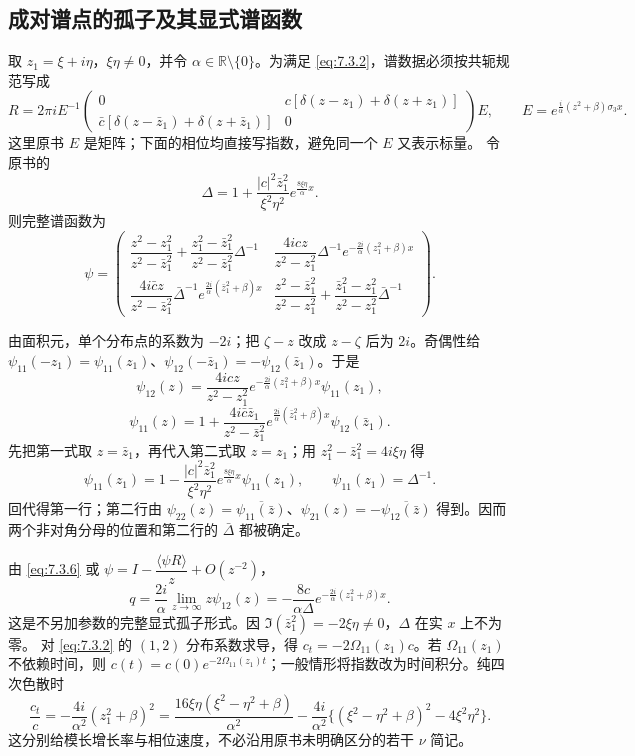\documentclass[lang=cn,scheme=chinese,mode=simple,device=normal,color=blue,math=cm,thmcnt=section,12pt]{elegantbook}
\newcommand{\eqq}[2]{\tag{#1}\label{eq:#1}#2}
\begin{document}
\subsection{成对谱点的孤子及其显式谱函数}
取 $z_1=\xi+i\eta$，$\xi\eta\ne0$，并令 $\alpha\in\mathbb R\setminus\{0\}$。为满足 \eqref{eq:7.3.2}，谱数据必须按共轭规范写成
\begin{equation}
\eqq{7.3.17}{R=2\pi i E^{-1}\begin{pmatrix}0&c[\delta(z-z_1)+\delta(z+z_1)]\\
\bar c[\delta(z-\bar z_1)+\delta(z+\bar z_1)]&0\end{pmatrix}E,
\qquad E=e^{\frac{i}{\alpha}(z^2+\beta)\sigma_3x}.}
\end{equation}
这里原书 $E$ 是矩阵；下面的相位均直接写指数，避免同一个 $E$ 又表示标量。
令原书的
\[
\Delta=1+\dfrac{|c|^2\bar z_1^2}{\xi^2\eta^2}e^{\frac{8\xi\eta}{\alpha}x}.
\]
则完整谱函数为
\begin{equation}
\eqq{7.3.18}{\psi=\begin{pmatrix}
\dfrac{z^2-z_1^2}{z^2-\bar z_1^2}+\dfrac{z_1^2-\bar z_1^2}{z^2-\bar z_1^2}\Delta^{-1}
&\dfrac{4icz}{z^2-z_1^2}\Delta^{-1}e^{-\frac{2i}{\alpha}(z_1^2+\beta)x}\\[5pt]
\dfrac{4i\bar cz}{z^2-\bar z_1^2}\bar\Delta^{-1}e^{\frac{2i}{\alpha}(\bar z_1^2+\beta)x}
&\dfrac{z^2-\bar z_1^2}{z^2-z_1^2}+\dfrac{\bar z_1^2-z_1^2}{z^2-z_1^2}\bar\Delta^{-1}
\end{pmatrix}.}
\end{equation}
\begin{callout}
由面积元，单个分布点的系数为 $-2i$；把 $\zeta-z$ 改成 $z-\zeta$ 后为 $2i$。奇偶性给 $\psi_{11}(-z_1)=\psi_{11}(z_1)$、$\psi_{12}(-\bar z_1)=-\psi_{12}(\bar z_1)$。于是
\[
\psi_{12}(z)=\dfrac{4icz}{z^2-z_1^2}e^{-\frac{2i}{\alpha}(z_1^2+\beta)x}\psi_{11}(z_1),
\]
\[
\psi_{11}(z)=1+\dfrac{4i\bar c\bar z_1}{z^2-\bar z_1^2}
e^{\frac{2i}{\alpha}(\bar z_1^2+\beta)x}\psi_{12}(\bar z_1).
\]
先把第一式取 $z=\bar z_1$，再代入第二式取 $z=z_1$；用 $z_1^2-\bar z_1^2=4i\xi\eta$ 得
\[
\psi_{11}(z_1)=1-\dfrac{|c|^2\bar z_1^2}{\xi^2\eta^2}e^{\frac{8\xi\eta}{\alpha}x}\psi_{11}(z_1),
\qquad \psi_{11}(z_1)=\Delta^{-1}.
\]
回代得第一行；第二行由 $\psi_{22}(z)=\overline{\psi_{11}(\bar z)}$、$\psi_{21}(z)=-\overline{\psi_{12}(\bar z)}$ 得到。因而两个非对角分母的位置和第二行的 $\bar\Delta$ 都被确定。
\end{callout}
由 \eqref{eq:7.3.6} 或 $\psi=I-\dfrac{\langle\psi R\rangle}{z}+O(z^{-2})$，
\[
q=\dfrac{2i}{\alpha}\lim\limits_{z\to\infty}z\psi_{12}(z)
=-\dfrac{8c}{\alpha\Delta}e^{-\frac{2i}{\alpha}(z_1^2+\beta)x}.
\]
这是不另加参数的完整显式孤子形式。因 $\Im(\bar z_1^2)=-2\xi\eta\ne0$，$\Delta$ 在实 $x$ 上不为零。
对 \eqref{eq:7.3.2} 的 $(1,2)$ 分布系数求导，得 $c_t=-2\Omega_{11}(z_1)c$。若 $\Omega_{11}(z_1)$ 不依赖时间，则
$c(t)=c(0)e^{-2\Omega_{11}(z_1)t}$；一般情形将指数改为时间积分。纯四次色散时
\[
\dfrac{c_t}{c}=-\dfrac{4i}{\alpha^2}(z_1^2+\beta)^2
=\dfrac{16\xi\eta(\xi^2-\eta^2+\beta)}{\alpha^2}
-\dfrac{4i}{\alpha^2}\{(\xi^2-\eta^2+\beta)^2-4\xi^2\eta^2\}.
\]
这分别给模长增长率与相位速度，不必沿用原书未明确区分的若干 $\nu$ 简记。
\end{document}
